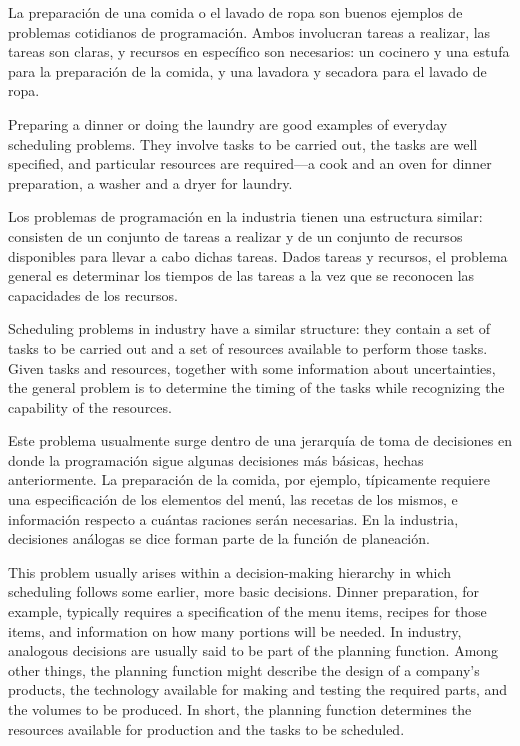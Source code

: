 \documentclass[draft,12pt,headsepline,footsepline,paper=letter]{scrreprt}
\begin{document}
\iffalse
La preparación de una comida o el lavado de ropa son buenos ejemplos de problemas cotidianos de programación. Ambos involucran tareas a realizar, las tareas son claras, y recursos en específico son necesarios: un cocinero y una estufa para la preparación de la comida, y una lavadora y secadora para el lavado de ropa.

Preparing a dinner or doing the laundry are good examples of everyday scheduling problems. They involve tasks to be carried out, the tasks are well specified, and particular resources are required—a cook and an oven for dinner preparation, a washer and a dryer for laundry. 

Los problemas de programación en la industria tienen una estructura similar: consisten de un conjunto de tareas a realizar y de un conjunto de recursos disponibles para llevar a cabo dichas tareas. Dados tareas y recursos, el problema general es determinar los tiempos de las tareas a la vez que se reconocen las capacidades de los recursos.

Scheduling problems in industry have a similar structure: they contain a set of tasks to be carried out and a set of resources available to perform those tasks. Given tasks and resources, together with some information about uncertainties, the general problem is to determine the timing of the tasks while recognizing the capability of the resources. 

Este problema usualmente surge dentro de una jerarquía de toma de decisiones en donde la programación sigue algunas decisiones más básicas, hechas anteriormente. La preparación de la comida, por ejemplo, típicamente requiere una especificación de los elementos del menú, las recetas de los mismos, e información respecto a cuántas raciones serán necesarias. En la industria, decisiones análogas se dice forman parte de la función de planeación.

This problem usually arises within a decision-making hierarchy in which scheduling follows some earlier, more basic decisions. Dinner preparation, for example, typically requires a specification of the menu items, recipes for those items, and information on how many portions will be needed. In industry, analogous decisions are usually said to be part of the planning function. Among other things, the planning function might describe the design of a company’s products, the technology available for making and testing the required parts, and the volumes to be produced. In short, the planning function determines the resources available for production and the tasks to be scheduled.
\end{document}
